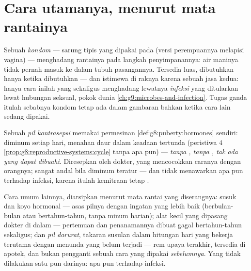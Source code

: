 \section{Cara utamanya, menurut mata rantainya}

\begin{definition}\label{def:g8:contraception:condom}
Sebuah \emph{kondom} --- sarung tipis yang
dipakai pada  (versi perempuannya melapisi vagina) ---
menghadang rantainya pada langkah penyimpanannya: air
maninya tidak pernah masuk ke dalam tubuh pasangannya.
Tersedia luas, dibutuhkan hanya ketika dibutuhkan --- dan
istimewa di raknya karena sebuah jasa kedua: hanya cara
inilah yang sekaligus menghadang lewatnya \emph{infeksi}
yang ditularkan lewat hubungan seksual, pokok dunia
\cref{ch:g9:microbes-and-infection}. Tugas ganda itulah
sebabnya kondom tetap ada dalam gambaran bahkan ketika cara
lain sedang dipakai.
\end{definition}

\begin{definition}\label{def:g8:contraception:pill}
Sebuah \emph{pil kontrasepsi} memakai
permesinan \cref{def:g8:puberty:hormones} sendiri: diminum
setiap hari,  menahan daur  dalam
keadaan tertunda (peristiwa 4
\cref{prop:g8:reproductive-systems:cycle} tanpa 
apa pun) --- \emph{tanpa , tanpa , tak ada
yang dapat dibuahi}. Diresepkan oleh dokter, yang
mencocokkan caranya dengan orangnya; sangat andal bila
diminum teratur --- dan tidak menawarkan apa pun terhadap
infeksi, karena itulah kemitraan tetap .
\end{definition}

\begin{example}\label{ex:g8:contraception:shelf}
Cara umum lainnya, diarsipkan menurut mata rantai yang
diserangnya: susuk dan koyo hormonal --- asas pilnya dengan
ingatan yang lebih baik (berbulan-bulan atau
bertahun-tahun, tanpa minum harian); alat kecil yang
dipasang dokter di dalam  --- pertemuan dan
penanamannya dibuat gagal bertahun-tahun sekaligus; dan
\emph{pil darurat}, takaran  susulan dalam hitungan
hari yang bekerja terutama dengan menunda  yang belum
terjadi --- rem upaya terakhir, tersedia di apotek, dan
bukan pengganti sebuah cara yang dipakai \emph{sebelumnya}.
Yang tidak dilakukan satu pun darinya: apa pun terhadap
infeksi.
\end{example}

